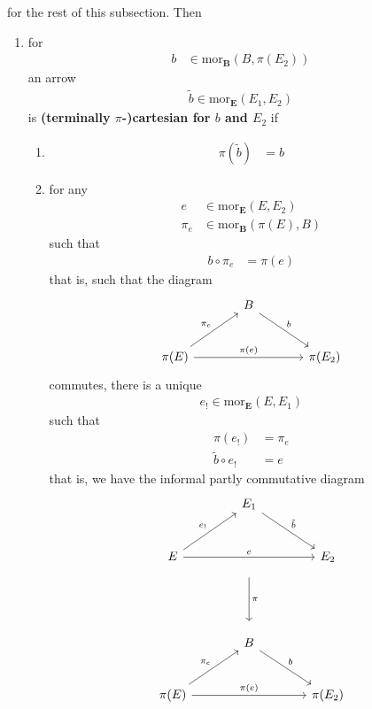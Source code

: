 for the rest of this subsection.
Then
\begin{enumerate}
\item[(1T)]
for
\begin{align*}
  b
  &\in
  \mathrm{mor}_{\mathbf{B}}
  \left(
    B,
    \pi(E_{2})
  \right)
\end{align*}
an arrow
\begin{align*}
  \widetilde{b}
  \in
  \mathrm{mor}_{\mathbf{E}}(E_{1},E_{2})
\end{align*}
is \textbf{(terminally $\pi$-)cartesian for $b$ and $E_{2}$} if
\begin{enumerate}
\item[(TC1)]
\begin{align*}
  \pi(\widetilde{b})
  &=
  b
\end{align*}
\item[(TC2)]
for any
\begin{align*}
  e
  &\in
  \mathrm{mor}_{\mathbf{E}}(E,E_{2})
  \\
  \pi_{e}
  &\in
  \mathrm{mor}_{\mathbf{B}}
  \left(
    \pi(E),
    B
  \right)
\end{align*}
such that
\begin{align*}
  b
  \circ
  \pi_{e}
  &=
  \pi(e)
\end{align*}
that is, such that the diagram
\[
\begin{tikzcd}[sep=large]
  &
  B
  \arrow{dr}{b}
  &
  \\
  \pi(E)
  \arrow{ur}{\pi_{e}}
  \arrow{rr}{\pi(e)}
  &
  &
  \pi(E_{2})
\end{tikzcd}
\]
commutes, there is a unique
\begin{align*}
  e_{!}
  \in
  \mathrm{mor}_{\mathbf{E}}(E,E_{1})
\end{align*}
such that
\begin{align*}
  \pi(e_{!})
  &=
  \pi_{e}
  \\
  \tilde{b}
  \circ
  e_{!}
  &=
  e
\end{align*}
that is, we have the informal partly commutative diagram
\[
\begin{tikzcd}[sep=large]
  &
  E_{1}
  \arrow{dr}{\tilde{b}}
  &
  \\
  E
  \arrow{ur}{e_{!}}
  \arrow{rr}{e}
  &
  \arrow[shorten <= 10pt, shorten >= 10pt]{dd}{\pi}
  &
  E_{2}
  \\
  &
  &
  \\
  &
  B
  \arrow{dr}{b}
  &
  \\
  \pi(E)
  \arrow{ur}{\pi_{e}}
  \arrow{rr}{\pi(e)}
  &
  &
  \pi(E_{2})

\end{tikzcd}\]
\end{enumerate}
\end{enumerate}
